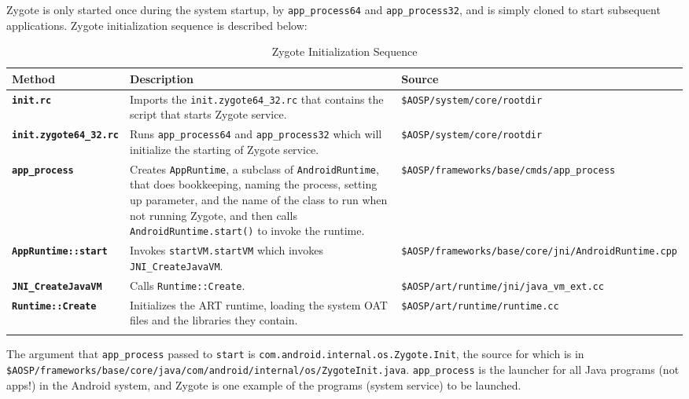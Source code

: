 Zygote is only started once during the system startup, by \texttt{app\_process64} and \texttt{app\_process32}, and is simply cloned to start subsequent applications. Zygote initialization sequence is described below:
\begin{longtable}{p{.25\linewidth}  p{.50\linewidth} p{.25\linewidth}} 
\toprule
Method 	& Description & Source\\
\midrule

\texttt{\textbf{init.rc}} 
&Imports the \texttt{init.zygote64\_32.rc} that contains the script that starts Zygote service.
&\texttt{\$AOSP/system/core/rootdir}\\

\texttt{\textbf{init.zygote64\_32.rc}} 
&Runs \texttt{app\_process64} and \texttt{app\_process32} which will initialize the starting of Zygote service.
&\texttt{\$AOSP/system/core/rootdir}\\

\texttt{\textbf{app\_process}} 
&Creates \texttt{AppRuntime}, a subclass of \texttt{AndroidRuntime}, that does bookkeeping, naming the process, setting up parameter, and the name of the class to run when not running Zygote, and then calls \texttt{AndroidRuntime.start()} to invoke the runtime.
&\texttt{\$AOSP/frameworks/base/cmds/app\_process}\\

\texttt{\textbf{AppRuntime::start}} 
&Invokes \texttt{startVM.startVM} which invokes \texttt{JNI\_CreateJavaVM}.
&\texttt{\$AOSP/frameworks/base/core/jni/AndroidRuntime.cpp}\\

\texttt{\textbf{JNI\_CreateJavaVM}} 
&Calls \texttt{Runtime::Create}.
&\texttt{\$AOSP/art/runtime/jni/java\_vm\_ext.cc}\\

\texttt{\textbf{Runtime::Create}} 
&Initializes the ART runtime, loading the system OAT files and the libraries they contain.
&\texttt{\$AOSP/art/runtime/runtime.cc}\\

\midrule
\caption{Zygote Initialization Sequence} 
\label{tab:zygoteinitializationsequence}
\end{longtable}

The argument that \texttt{app\_process} passed to \texttt{start} is \texttt{com.android.internal.os.Zygote.Init}, the source for which is in \texttt{\$AOSP/frameworks/base/core/java/com/android/internal/os/ZygoteInit.java}. \texttt{app\_process} is the launcher for all Java programs (not apps!) in the Android system, and Zygote is one example of the programs (system service) to be launched.

